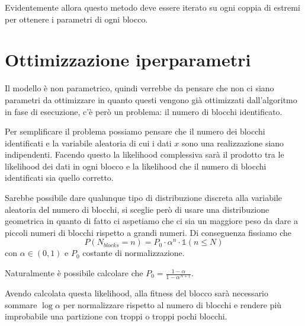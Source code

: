 \documentclass[10pt,a4paper]{report}
\begin{document}
Evidentemente allora questo metodo deve essere iterato su ogni coppia di estremi per ottenere i parametri di ogni blocco.
\section{Ottimizzazione iperparametri}
Il modello è non parametrico, quindi verrebbe da pensare che non ci siano parametri da ottimizzare in quanto questi vengono già ottimizzati dall'algoritmo in fase di esecuzione, c'è però un problema: il numero di blocchi identificato.

Per semplificare il problema possiamo pensare che il numero dei blocchi identificati e la variabile aleatoria di cui i dati $x$ sono una realizzazione siano indipendenti. Facendo questo la likelihood complessiva sarà il prodotto tra le likelihood dei dati in ogni blocco e la likelihood che il numero di blocchi identificati sia quello corretto.

Sarebbe possibile dare qualunque tipo di distribuzione discreta alla variabile aleatoria del numero di blocchi, si sceglie però di usare una distribuzione geometrica in quanto di fatto ci aspetiamo che ci sia un maggiore peso da dare a piccoli numeri di blocchi rispetto a grandi numeri. Di conseguenza fissiamo che 
$$P(N_{blocks}=n)=P_0\cdot\alpha^n\cdot\mathds{1}(n\leq N)$$
con $\alpha\in(0,1)$ e $P_0$ costante di normalizzazione.

Naturalmente è possibile calcolare che $P_0 = \frac{1-\alpha}{1-\alpha^{N+1}}$.

Avendo calcolata questa likelihood, alla fitness del blocco sarà necessario sommare $\log\alpha$ per normalizzare rispetto al numero di blocchi e rendere più improbabile una partizione con troppi o troppi pochi blocchi.
\end{document}
